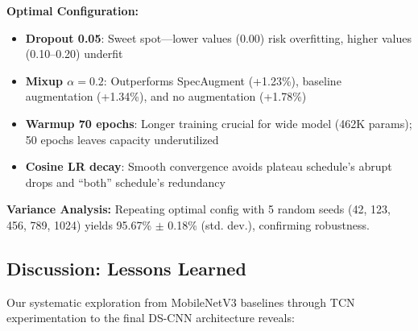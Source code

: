 \documentclass[10pt,a4paper,twoside]{article}
\begin{document}
\noindent\textbf{Optimal Configuration:}
\begin{itemize}
	\item \textbf{Dropout 0.05}: Sweet spot—lower values (0.00) risk overfitting, higher values (0.10--0.20) underfit
	\item \textbf{Mixup $\alpha=0.2$}: Outperforms SpecAugment (+1.23\%), baseline augmentation (+1.34\%), and no augmentation (+1.78\%)
	\item \textbf{Warmup 70 epochs}: Longer training crucial for wide model (462K params); 50 epochs leaves capacity underutilized
	\item \textbf{Cosine LR decay}: Smooth convergence avoids plateau schedule's abrupt drops and ``both'' schedule's redundancy
\end{itemize}

\noindent\textbf{Variance Analysis:} Repeating optimal config with 5 random seeds (42, 123, 456, 789, 1024) yields 95.67\% $\pm$ 0.18\% (std. dev.), confirming robustness.

\subsection{Discussion: Lessons Learned}
\label{sec:lessons}

Our systematic exploration from MobileNetV3 baselines through TCN experimentation to the final DS-CNN architecture reveals:
\end{document}
